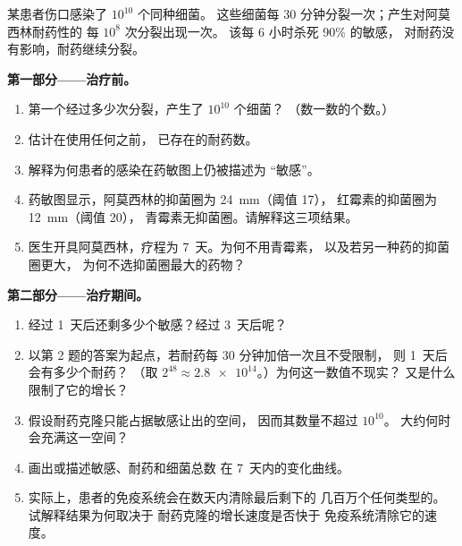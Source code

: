\begin{problem}
\label{pb:g11:antibiotic-resistance:1}
某患者伤口感染了 $10^{10}$ 个同种细菌。
这些细菌每 30 分钟分裂一次；产生对阿莫西林耐药性的
每 $10^8$ 次分裂出现一次。
该每 6 小时杀死 90\% 的敏感，
对耐药没有影响，耐药继续分裂。

\medskip
\noindent\textbf{第一部分——治疗前。}
\begin{enumerate}
  \item 第一个经过多少次分裂，产生了 $10^{10}$ 个细菌？
        （数一数的个数。）
  \item 估计在使用任何之前，
        已存在的耐药数。
  \item 解释为何患者的感染在药敏图上仍被描述为
        “敏感”。
  \item 药敏图显示，阿莫西林的抑菌圈为 \qty{24}{mm}（阈值 17），
        红霉素的抑菌圈为 \qty{12}{mm}（阈值 20），
        青霉素无抑菌圈。请解释这三项结果。
  \item 医生开具阿莫西林，疗程为 \num{7}~天。为何不用青霉素，
        以及若另一种药的抑菌圈更大，
        为何不选抑菌圈最大的药物？
\end{enumerate}

\medskip
\noindent\textbf{第二部分——治疗期间。}
\begin{enumerate}[resume]
  \item 经过 \num{1}~天后还剩多少个敏感？经过 \num{3}~天后呢？
  \item 以第 2 题的答案为起点，若耐药每 30 分钟加倍一次且不受限制，
        则 \num{1}~天后会有多少个耐药？
        （取 $2^{48} \approx \num{2.8e14}$。）为何这一数值不现实？
        又是什么限制了它的增长？
  \item 假设耐药克隆只能占据敏感让出的空间，
        因而其数量不超过 $10^{10}$。
        大约何时会充满这一空间？
  \item 画出或描述敏感、耐药和细菌总数
        在 \num{7}~天内的变化曲线。
  \item 实际上，患者的免疫系统会在数天内清除最后剩下的
        几百万个任何类型的。试解释结果为何取决于
        耐药克隆的增长速度是否快于
        免疫系统清除它的速度。
\end{enumerate}


\end{problem}
